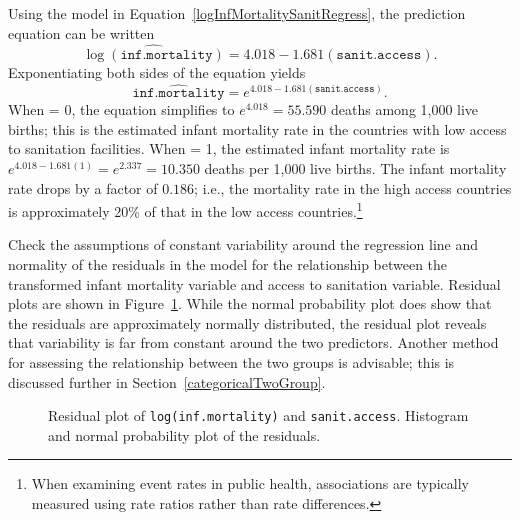 \textD{\newpage}

Using the model in Equation~\ref{logInfMortalitySanitRegress}, the prediction equation can be written
\[
    \widehat{\log(\texttt{inf.mortality})} = 4.018 -1.681(\texttt{sanit.access}).
\]
Exponentiating both sides of the equation yields
\[
    \widehat{\texttt{inf.mortality}} = e^{4.018 -1.681(\texttt{sanit.access})}.
\]
When  = 0, the equation simplifies to $e^{4.018} = 55.590$ deaths among 1,000 live births; this is the estimated infant mortality rate in the countries with low access to sanitation facilities.  When  = 1, the estimated infant mortality rate is $e^{4.018-1.681(1)}= e^{2.337} = 10.350$ deaths per 1,000 live births.  The infant mortality rate drops by a factor of $0.186$; i.e., the mortality rate in the high access countries is approximately 20\% of that in the low access countries.\footnote{When examining event rates in public health, associations are typically measured using rate ratios rather than rate differences.}


\begin{examplewrap}
\begin{nexample}{Check the assumptions of constant variability around the regression line and normality of the residuals in the model for the relationship between the transformed infant mortality variable and access to sanitation variable. Residual plots are shown in Figure~\ref{wdiResid}.}\label{wdiAssumptionsEx}%
While the normal probability plot does show that the residuals are approximately normally distributed, the residual plot reveals that variability is far from constant around the two predictors. Another method for assessing the relationship between the two groups is advisable; this is discussed further in Section~\ref{categoricalTwoGroup}.
\end{nexample}
\end{examplewrap}

\begin{figure}[h]
	\centering
	\caption{ Residual plot of \texttt{log(inf.mortality)} and \texttt{sanit.access}.  Histogram and normal probability plot of the residuals.}
	\label{wdiResid}
\end{figure}


